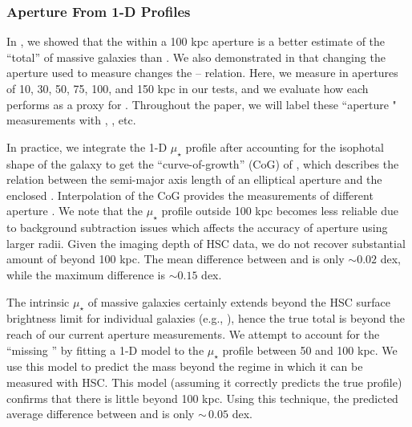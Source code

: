 \documentclass[fleqn,usenatbib,useAMS]{mnras}
\begin{document}
\subsubsection{Aperture \mstar{} From 1-D Profiles}
    \label{sec:maper}

    In \citet{Huang2018b}, we showed that the \mstar{} within a 100 kpc aperture is a better
    estimate of the ``total'' \mstar{} of massive galaxies than \mcmodel{}. 
    We also demonstrated in \citet{Huang2018c, Huang2020} that changing the aperture used to measure
    \mstar{} changes the \mstar{}--\mvir{} relation.
    Here, we measure \mstar{} in apertures of 10, 30, 50, 75, 100, and 150 kpc in our \topn{} tests,
    and we evaluate how each performs as a proxy for \mvir{}. 
    Throughout the paper, we will label these ``aperture \mstar{}" measurements with ,
    , etc. 

    In practice, we integrate the 1-D $\mu_{\star}$ profile after accounting for the isophotal shape
    of the galaxy to get the ``curve-of-growth'' (CoG) of \mstar{}, which describes the relation
    between the semi-major axis length of an elliptical aperture and the enclosed \mstar{}.
    Interpolation of the CoG provides the measurements of different aperture \mstar{}.
    We note that the $\mu_{\star}$ profile outside 100 kpc becomes less reliable due to background
    subtraction issues which affects the accuracy of aperture \mstar{} using larger radii.
    Given the imaging depth of HSC data, we do not recover substantial amount of \mstar{} beyond 100
    kpc.
    The mean difference between  and  is only $\sim 0.02$ dex, while the
    maximum difference is $\sim 0.15$ dex. 

    The intrinsic $\mu_{\star}$ of massive galaxies certainly extends beyond the HSC surface
    brightness limit for individual galaxies (e.g., \citealt{Wang2019, Zhang2019, Montes2021,
    Kluge2021}), hence the true total \mstar{} is beyond the reach of our current aperture \mstar{}
    measurements.
    We attempt to account for the ``missing \mstar{}'' by fitting a 1-D \ser{} model to the
    $\mu_{\star}$ profile between 50 and 100 kpc. We use this model to predict the mass beyond
    the regime in which it can be measured with HSC.
    This model (assuming it correctly predicts the true profile) confirms that there is little
    \mstar{} beyond 100 kpc.
    Using this technique, the predicted average difference between  and  is
    only $\sim\,0.05$ dex.
\end{document}
